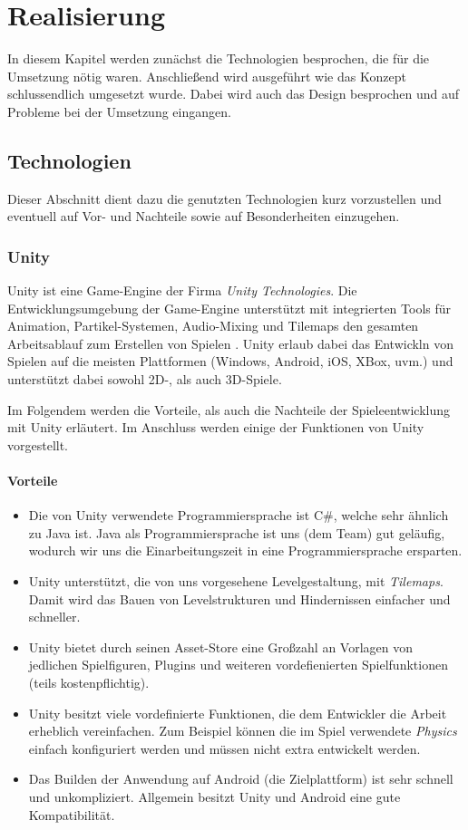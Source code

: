 \chapter{Realisierung}
\label{cha:realisierung}
In diesem Kapitel werden zunächst die Technologien besprochen, die für die Umsetzung nötig waren. Anschließend wird ausgeführt wie das Konzept schlussendlich umgesetzt wurde. Dabei wird auch das Design besprochen und auf Probleme bei der Umsetzung eingangen.

\section{Technologien}
\label{sec:grundlagen:technologien}
Dieser Abschnitt dient dazu die genutzten Technologien kurz vorzustellen und eventuell auf Vor- und Nachteile sowie auf Besonderheiten einzugehen.

\subsection{Unity}
\label{subsec:realisierung:technologien:unity}
Unity ist eine Game-Engine der Firma \textit{Unity Technologies}. Die Entwicklungsumgebung der Game-Engine unterstützt mit integrierten Tools für Animation, Partikel-Systemen, Audio-Mixing und Tilemaps den gesamten Arbeitsablauf zum Erstellen von Spielen \cite{unity_mobile}. Unity erlaub dabei das Entwickln von Spielen auf die meisten Plattformen (Windows, Android, iOS, XBox, uvm.) und unterstützt dabei sowohl 2D-, als auch 3D-Spiele.

Im Folgendem werden die Vorteile, als auch die Nachteile der Spieleentwicklung mit Unity erläutert. Im Anschluss werden einige der Funktionen von Unity vorgestellt.
\subsubsection*{Vorteile}
\begin{itemize}
    \item Die von Unity verwendete Programmiersprache ist C\#, welche sehr ähnlich zu Java ist. Java als Programmiersprache ist uns (dem Team) gut geläufig, wodurch wir uns die Einarbeitungszeit in eine Programmiersprache ersparten.
    \item Unity unterstützt, die von uns vorgesehene Levelgestaltung, mit \textit{Tilemaps}. Damit wird das Bauen von Levelstrukturen und Hindernissen einfacher und schneller.
    \item Unity bietet durch seinen Asset-Store eine Großzahl an Vorlagen von jedlichen Spielfiguren, Plugins und weiteren vordefienierten Spielfunktionen (teils kostenpflichtig).
    \item Unity besitzt viele vordefinierte Funktionen, die dem Entwickler die Arbeit erheblich vereinfachen. Zum Beispiel können die im Spiel verwendete \textit{Physics} einfach konfiguriert werden und müssen nicht extra entwickelt werden.
    \item Das Builden der Anwendung auf Android (die Zielplattform) ist sehr schnell und unkompliziert. Allgemein besitzt Unity und Android eine gute Kompatibilität.
\end{itemize}

